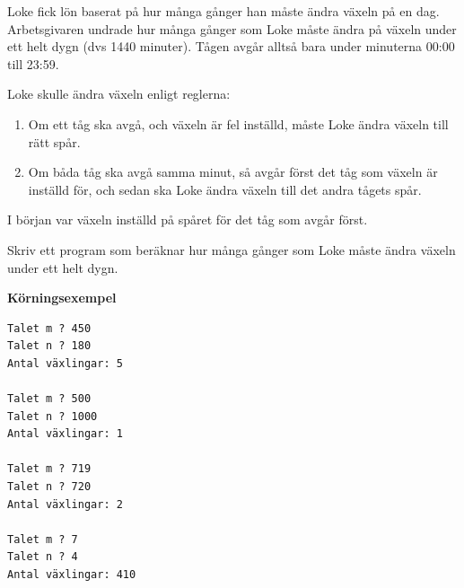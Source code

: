 \documentclass[a4paper,12pt]{article}
\begin{document}
Loke fick lön baserat på hur många gånger han måste ändra växeln på en dag. Arbetsgivaren undrade hur många gånger som Loke måste ändra på växeln under ett helt dygn (dvs 1440 minuter). Tågen avgår alltså bara under minuterna 00:00 till 23:59.

Loke skulle ändra växeln enligt reglerna:
\begin{enumerate}
\item Om ett tåg ska avgå, och växeln är fel inställd, måste Loke ändra växeln till rätt spår.
\item Om båda tåg ska avgå samma minut, så avgår först det tåg som växeln är inställd för, och sedan ska Loke ändra växeln till det andra tågets spår.
\end{enumerate}

I början var växeln inställd på spåret för det tåg som avgår först.

Skriv ett program som beräknar hur många gånger som Loke måste ändra växeln under ett helt dygn.

\textbf{Körningsexempel}
\begin{lstlisting}
Talet m ? 450
Talet n ? 180
Antal växlingar: 5

Talet m ? 500
Talet n ? 1000
Antal växlingar: 1

Talet m ? 719
Talet n ? 720
Antal växlingar: 2

Talet m ? 7
Talet n ? 4
Antal växlingar: 410
\end{lstlisting}

\end{document}
